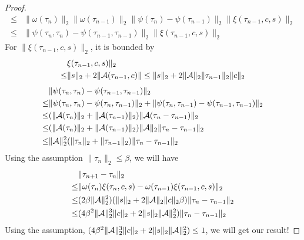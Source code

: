 \documentclass[aos,preprint]{imsart}
\theoremstyle{remark}
\begin{document}
\begin{appendix}
\begin{proof}
\[\begin{aligned}
\leq & \|\omega(\tau_n)\|_2\|\omega(\tau_{n-1})\|_2\|\psi(\tau_n)-\psi(\tau_{n-1})\|_2\|\xi(\tau_{n-1}, c, s)\|_2\\
\leq &\|\psi(\tau_n,\tau_n)-\psi(\tau_{n-1},\tau_{n-1})\|_2\|\xi(\tau_{n-1}, c, s)\|_2
\end{aligned}
\]
For $\|\xi(\tau_{n-1}, c, s)\|_2$, it is bounded by
\[
\begin{aligned}
&\xi(\tau_{n-1}, c, s)\|_2\\
\leq &\|s\|_2+2\|{\cal A}(\tau_{n-1},c)\|
\leq \|s\|_2+2\|{\cal A}\|_2\|\tau_{n-1}\|_2\|c\|_2
\end{aligned}
\]
\[
\begin{aligned}
&\|\psi(\tau_n,\tau_n)-\psi(\tau_{n-1},\tau_{n-1})\|_2\\
\leq&\|\psi(\tau_n,\tau_n)-\psi(\tau_{n}, \tau_{n-1})\|_2+\|\psi(\tau_n,\tau_{n-1})-\psi(\tau_{n-1},\tau_{n-1})\|_2\\
\leq & (\|{\cal A}(\tau_n)\|_2+\|{\cal A}(\tau_{n-1})\|_2)\|{\cal A}(\tau_n-\tau_{n-1})\|_2\\
\leq & (\|{\cal A}(\tau_n)\|_2+\|{\cal A}(\tau_{n-1})\|_2)\|{\cal A}\|_2\|\tau_n-\tau_{n-1}\|_2\\
\leq &\|{\cal A}\|_2^2(\|\tau_n\|_2+\|\tau_{n-1}\|_2)\|\tau_n-\tau_{n-1}\|_2
\end{aligned}
\]
Using the assumption $\|\tau_n\|_2\leq \beta$, we will have
\[
\begin{aligned}
&\|\tau_{n+1}-\tau_{n}\|_2\\
\leq &\|\omega(\tau_n)\xi(\tau_n, c, s) -\omega(\tau_{n-1})\xi(\tau_{n-1}, c, s) \|_2\\
\leq & (2\beta \|{\cal A}\|_2^2)(\|s\|_2+2\|{\cal A}\|_2\|c\|_2\beta) \|\tau_n-\tau_{n-1}\|_2\\
\leq & (4\beta^2\|{\cal A}\|_2^3\|c\|_2+2\|s\|_2\|{\cal A}\|_2^2)\|\tau_n-\tau_{n-1}\|_2
\end{aligned}
\]
Using the assumption, $(4\beta^2\|{\cal A}\|_2^3\|c\|_2+2\|s\|_2\|{\cal A}\|_2^2)\leq 1$, we will get our result!
\end{proof}


\end{appendix}
\end{document}
